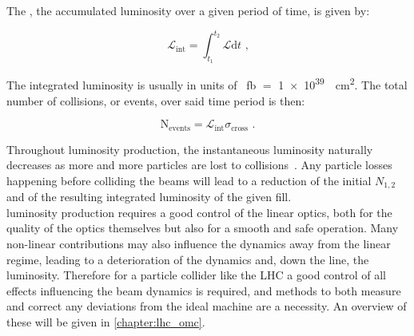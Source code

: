 The , the accumulated luminosity over a given period of time, is given by:

\begin{equation}
    \mathcal{L}_{\mathrm{int}} = \int_{t_1}^{t_2} \mathcal{L} \mathrm{d}t \text{ ,}
    \label{equation:integrated_luminosity}
\end{equation}

The integrated luminosity is usually in units of \unit{\per\femto\barn} \(=\) \qty{1e39}{\per\square\centi\meter}.
The total number of collisions, or events, over said time period is then:

\begin{equation}
    \mathrm{N_{events}} = \mathcal{L}_{\mathrm{int}} \sigma_{\mathrm{cross}} \text{ .}
    \label{equation:total_number_collisions}
\end{equation}

Throughout luminosity production, the instantaneous luminosity naturally decreases as more and more particles are lost to collisions~\cite{PRES:Hostettler:LHC_Lumi_Lifetime}.
Any particle losses happening before colliding the beams will lead to a reduction of the initial \(N_{1,2}\) and of the resulting integrated luminosity of the given fill.\\

\Gls{luminosity} production requires a good control of the linear optics, both for the quality of the optics themselves but also for a smooth and safe operation.
Many non-linear contributions may also influence the dynamics away from the linear regime, leading to a deterioration of the dynamics and, down the line, the luminosity.
Therefore for a particle collider like the \gls{LHC} a good control of all effects influencing the beam dynamics is required, and methods to both measure and correct any deviations from the ideal machine are a necessity.
An overview of these will be given in \cref{chapter:lhc_omc}.

\glsresetall                                     %
